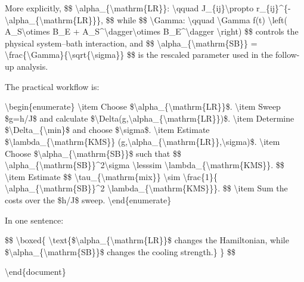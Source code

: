 {More explicitly,
\$\$
\textbackslash{}alpha\_\{\textbackslash{}mathrm\{LR\}\}:
\textbackslash{}qquad
J\_\{ij\}\textbackslash{}propto r\_\{ij\}\textasciicircum{}\{-\textbackslash{}alpha\_\{\textbackslash{}mathrm\{LR\}\}\},
\$\$
while
\$\$
\textbackslash{}Gamma:
\textbackslash{}qquad
\textbackslash{}Gamma f(t)
\textbackslash{}left(
A\_S\textbackslash{}otimes B\_E
+
A\_S\textasciicircum{}\textbackslash{}dagger\textbackslash{}otimes B\_E\textasciicircum{}\textbackslash{}dagger
\textbackslash{}right)
\$\$
controls the physical system--bath interaction, and
\$\$
\textbackslash{}alpha\_\{\textbackslash{}mathrm\{SB\}\}
=
\textbackslash{}frac\{\textbackslash{}Gamma\}\{\textbackslash{}sqrt\{\textbackslash{}sigma\}\}
\$\$
is the rescaled parameter used in the follow-up analysis.

The practical workflow is:

\textbackslash{}begin\{enumerate\}
    \textbackslash{}item Choose \$\textbackslash{}alpha\_\{\textbackslash{}mathrm\{LR\}\}\$.
    \textbackslash{}item Sweep \$g=h/J\$ and calculate
    \$\textbackslash{}Delta(g,\textbackslash{}alpha\_\{\textbackslash{}mathrm\{LR\}\})\$.
    \textbackslash{}item Determine \$\textbackslash{}Delta\_\{\textbackslash{}min\}\$ and choose \$\textbackslash{}sigma\$.
    \textbackslash{}item Estimate
    \$\textbackslash{}lambda\_\{\textbackslash{}mathrm\{KMS\}\}
    (g,\textbackslash{}alpha\_\{\textbackslash{}mathrm\{LR\}\},\textbackslash{}sigma)\$.
    \textbackslash{}item Choose \$\textbackslash{}alpha\_\{\textbackslash{}mathrm\{SB\}\}\$ such that
    \$\$
    \textbackslash{}alpha\_\{\textbackslash{}mathrm\{SB\}\}\textasciicircum{}2\textbackslash{}sigma
    \textbackslash{}lesssim
    \textbackslash{}lambda\_\{\textbackslash{}mathrm\{KMS\}\}.
    \$\$
    \textbackslash{}item Estimate
    \$\$
    \textbackslash{}tau\_\{\textbackslash{}mathrm\{mix\}\}
    \textbackslash{}sim
    \textbackslash{}frac\{1\}\{
    \textbackslash{}alpha\_\{\textbackslash{}mathrm\{SB\}\}\textasciicircum{}2
    \textbackslash{}lambda\_\{\textbackslash{}mathrm\{KMS\}\}\}.
    \$\$
    \textbackslash{}item Sum the costs over the \$h/J\$ sweep.
\textbackslash{}end\{enumerate\}

In one sentence:

\$\$
\textbackslash{}boxed\{
\textbackslash{}text\{\$\textbackslash{}alpha\_\{\textbackslash{}mathrm\{LR\}\}\$ changes the Hamiltonian, while
\$\textbackslash{}alpha\_\{\textbackslash{}mathrm\{SB\}\}\$ changes the cooling strength.\}
\}
\$\$

\textbackslash{}end\{document\}}
